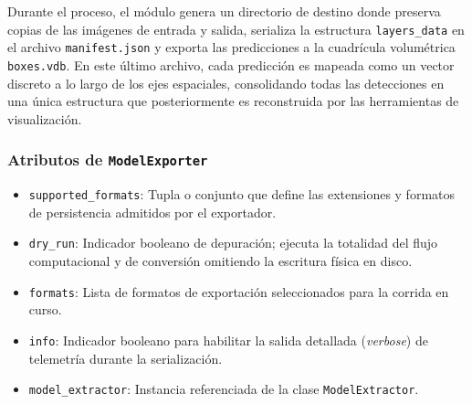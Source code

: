 Durante el proceso, el módulo genera un directorio de destino donde preserva copias de las imágenes de entrada y salida, 
serializa la estructura \texttt{layers\_data} en el archivo \texttt{manifest.json} y exporta las predicciones a la cuadrícula 
volumétrica \texttt{boxes.vdb}. En este último archivo, cada predicción es mapeada como un vector discreto a lo largo de los 
ejes espaciales, consolidando todas las detecciones en una única estructura que posteriormente es reconstruida por las herramientas de visualización.

\subsubsection*{Atributos de \texttt{ModelExporter}}
\begin{itemize}
    \item \texttt{supported\_formats}: Tupla o conjunto que define las extensiones y formatos de persistencia admitidos por el exportador.
    \item \texttt{dry\_run}: Indicador booleano de depuración; ejecuta la totalidad del flujo computacional y de conversión omitiendo la escritura física en disco.
    \item \texttt{formats}: Lista de formatos de exportación seleccionados para la corrida en curso.
    \item \texttt{info}: Indicador booleano para habilitar la salida detallada (\textit{verbose}) de telemetría durante la serialización.
    \item \texttt{model\_extractor}: Instancia referenciada de la clase \texttt{ModelExtractor}.
\end{itemize}

